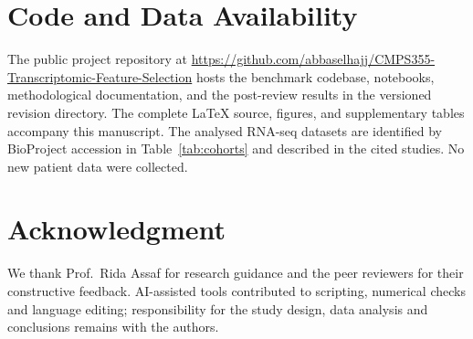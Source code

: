 \documentclass[conference,a4paper]{IEEEtran}
\begin{document}
\section*{Code and Data Availability}
The public project repository at \url{https://github.com/abbaselhajj/CMPS355-Transcriptomic-Feature-Selection} hosts the benchmark codebase, notebooks, methodological documentation, and the post-review results in the versioned revision directory. The complete LaTeX source, figures, and supplementary tables accompany this manuscript. The analysed RNA-seq datasets are identified by BioProject accession in Table~\ref{tab:cohorts} and described in the cited studies. No new patient data were collected.

\section*{Acknowledgment}
We thank Prof.\ Rida Assaf for research guidance and the peer reviewers for their constructive feedback. AI-assisted tools contributed to scripting, numerical checks and language editing; responsibility for the study design, data analysis and conclusions remains with the authors.



\clearpage
\onecolumn
\appendix

\end{document}
